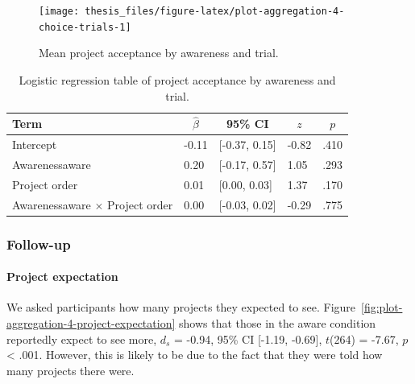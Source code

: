 \documentclass[a4paper, nobind, dvipsnames]{templates/ociamthesis}
\theoremstyle{definition}
\theoremstyle{definition}
\theoremstyle{definition}
\theoremstyle{definition}
\theoremstyle{remark}
\begin{document}
\begin{figure}
\texttt{[image: thesis\_files/figure-latex/plot-aggregation-4-choice-trials-1]} \caption{Mean project acceptance by awareness and trial.}\label{fig:plot-aggregation-4-choice-trials}
\end{figure}

\begin{table}[tbp]

\begin{center}
\begin{threeparttable}

\caption{\label{tab:awareness-project-order}Logistic regression table of project acceptance by awareness and trial.}

\begin{tabular}{lllll}
\toprule
Term & \multicolumn{1}{c}{$\hat{\beta}$} & \multicolumn{1}{c}{95\% CI} & \multicolumn{1}{c}{$z$} & \multicolumn{1}{c}{$p$}\\
\midrule
Intercept & -0.11 & {}[-0.37, 0.15] & -0.82 & .410\\
Awarenessaware & 0.20 & {}[-0.17, 0.57] & 1.05 & .293\\
Project order & 0.01 & {}[0.00, 0.03] & 1.37 & .170\\
Awarenessaware $\times$ Project order & 0.00 & {}[-0.03, 0.02] & -0.29 & .775\\
\bottomrule
\end{tabular}

\end{threeparttable}
\end{center}

\end{table}

\subsubsection{Follow-up}

\paragraph{Project expectation}

We asked participants how many projects they expected to see.
Figure~\ref{fig:plot-aggregation-4-project-expectation} shows that those in
the aware condition reportedly expect to see more,
\(d_s\) = -0.94, 95\% CI {[}-1.19, -0.69{]}, \(t\)(264) = -7.67, \(p\) \textless{} .001. However, this is likely to be due to
the fact that they were told how many projects there were.
\end{document}
